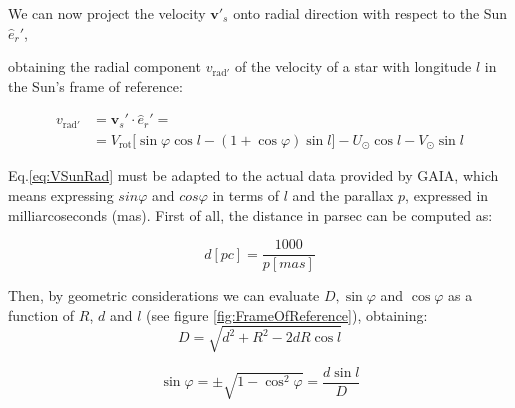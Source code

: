 \noindent 
We can now project the velocity $\bm{v'}_s$ onto radial direction with respect to the Sun $\hat{e}_r'$,

obtaining the radial component $v_{\text{rad}'}$ of the velocity of a star with longitude $l$ in the Sun's frame of reference:

\begin{equation}\label{eq:VSunRad}
    \begin{aligned}
        v_{\text{rad}'}  &= \bm{v}_s' \cdot \hat{e}_r' = \\ 
        &=V_{\text{rot}} \biggl[ \sin\varphi \cos l - (1 + \cos\varphi)\sin l \biggr] - U_{\odot} \cos l - V_{\odot} \sin l
    \end{aligned}
\end{equation}
\noindent



Eq.\ref{eq:VSunRad} must be adapted to the actual data provided by GAIA, which means expressing $sin\varphi$ and $cos\varphi$ in terms of $l$ and the parallax $p$, expressed in milliarcoseconds (\unit{mas}). First of all, the distance in parsec can be computed as:

\begin{equation}\label{eq:DistanceParallax}
    d[\unit{pc}] = \frac{1000}{p[\unit{mas}]}
\end{equation}

\noindent
Then, by geometric considerations we can evaluate $D, \sin\varphi$ and $\cos\varphi$ as a function of $R$, $d$ and $l$ (see figure \ref{fig:FrameOfReference}), obtaining:
\begin{equation}\label{eq:D}
    D=\sqrt{d^2 + R^2 - 2dR \cos l}
\end{equation}

\begin{equation}\label{eq:SinPhi}
    \sin\varphi = \pm \sqrt{1 - \cos^2 \varphi} = \frac{d\sin l}{D}
\end{equation}

